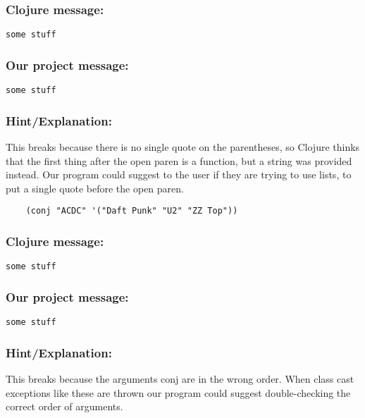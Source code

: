 \documentclass[12pt]{article}
\begin{document}
{\addtolength{\leftskip}{10mm}

	\subsubsection*{Clojure message:}
	
	\verb|some stuff|

	\subsubsection*{Our project message:}
	
	\verb|some stuff|
	
	\subsubsection*{Hint/Explanation:}
	
This breaks because there is no single quote on the parentheses, so Clojure thinks that the first thing after the open paren is a function, but a string was provided instead. Our program could suggest to the user if they are trying to use lists, to put a single quote before the open paren.
	
}

\begin{verbatim}
	(conj "ACDC" '("Daft Punk" "U2" "ZZ Top"))
\end{verbatim}

{\addtolength{\leftskip}{10mm}

	\subsubsection*{Clojure message:}
	
	\verb|some stuff|

	\subsubsection*{Our project message:}
	
	\verb|some stuff|
	
	\subsubsection*{Hint/Explanation:}
	
This breaks because the arguments conj are in the wrong order. When class cast exceptions like these are thrown our program could suggest double-checking the correct order of arguments.
	
}
\end{document}
